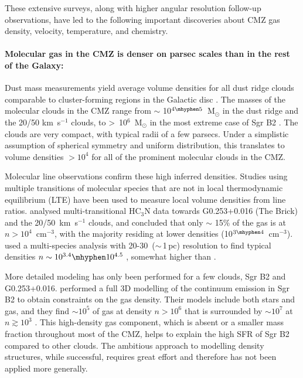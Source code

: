 These extensive surveys, along with higher angular resolution follow-up observations, have led to the following important discoveries about CMZ gas density, velocity, temperature, and chemistry.

\paragraph{Molecular gas in the CMZ is denser on parsec scales than in the rest of the Galaxy:}\label{subsubsec:densitystructure}
Dust mass measurements yield average volume densities for all dust ridge clouds comparable to cluster-forming regions in the Galactic disc \citep{Walker2015,Walker2016}.
The masses of the molecular clouds in the CMZ range from $\sim$ 10$^{4\mhyphen5}$~M$_{\odot}$ in the dust ridge and the 20/50 km~s$^{-1}$ clouds, to \textgreater \ 10$^{6}$~M$_{\odot}$ in the most extreme case of Sgr B2 \citep[e.g.][]{Immer2012b,Kauffmann2017a}.
The clouds are very compact, with typical radii of a few parsecs.
Under a simplistic assumption of spherical symmetry and uniform distribution, this translates to volume densities $>10^{4}$ \percc for all of the prominent molecular clouds in the CMZ. 

Molecular line observations confirm these high inferred densities.
Studies using multiple transitions of molecular species that are not in local thermodynamic equilibrium (LTE) have been used to measure local volume densities from line ratios.
\citet{Mills2018c} analysed multi-transitional HC$_{3}$N data towards G0.253+0.016 (The Brick) and the 20/50~km~s$^{-1}$ clouds, and concluded that only $\sim$ 15\% of the gas is at $n>10^{4}$~cm$^{-3}$, with the majority residing at lower densities (10$^{3\mhyphen4}$~cm$^{-3}$). 
\citet{Tanaka2018} used a multi-species analysis with 20-30\arcsec\ ($\sim$\,1\,pc) resolution to find typical densities $n\sim10^{3.4}\mhyphen10^{4.5}$ \percc, somewhat higher than \citet{Mills2018c}.

More detailed modeling has only been performed for a few clouds, Sgr B2 and G0.253+0.016.
\citet{Schmiedeke2016} performed a full 3D modelling of the continuum emission in Sgr B2 to obtain constraints on the gas density. 
Their models include both stars and gas, and they find $\sim10^5$ \msun of gas at density $n>10^6$ \percc that is surrounded by $\sim10^7$ \msun at $n\gtrsim10^3$ \percc.
This high-density gas component, which is absent or a smaller mass fraction throughout most of the CMZ, helps to explain the high SFR of Sgr B2 \citep{Barnes2017,Ginsburg2018b} compared to other clouds.
The ambitious \citet{Schmiedeke2016} approach to modelling density structures, while successful, requires great effort and therefore has not been applied more generally.

